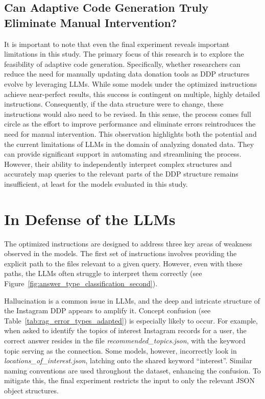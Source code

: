 \documentclass{DESSThesis}
\begin{document}
\subsection{Can Adaptive Code Generation Truly Eliminate Manual Intervention?}

It is important to note that even the final experiment reveals important limitations in this study. The primary focus of this research is to explore the feasibility of adaptive code generation. Specifically, whether researchers can reduce the need for manually updating data donation tools as DDP structures evolve by leveraging LLMs. While some models under the optimized instructions achieve near-perfect results, this success is contingent on multiple, highly detailed instructions. Consequently, if the data structure were to change, these instructions would also need to be revised. In this sense, the process comes full circle as the effort to improve performance and eliminate errors reintroduces the need for manual intervention. This observation highlights both the potential and the current limitations of LLMs in the domain of analyzing donated data. They can provide significant support in automating and streamlining the process. However, their ability to independently interpret complex structures and accurately map queries to the relevant parts of the DDP structure remains insufficient, at least for the models evaluated in this study.

\section{In Defense of the LLMs}

The optimized instructions are designed to address three key areas of weakness observed in the models. The first set of instructions involves providing the explicit path to the files relevant to a given query. However, even with these paths, the LLMs often struggle to interpret them correctly (see Figure~\ref{fig:answer_type_classification_second}). 

Hallucination is a common issue in LLMs, and the deep and intricate structure of the Instagram DDP appears to amplify it. Concept confusion (see Table~\ref{tab:rag_error_types_adapted}) is especially likely to occur. For example, when asked to identify the topics of interest Instagram records for a user, the correct answer resides in the file \emph{recommended\_topics.json}, with the keyword topic serving as the connection. Some models, however, incorrectly look in \emph{locations\_of\_interest.json}, latching onto the shared keyword “interest”. Similar naming conventions are used throughout the dataset, enhancing the confusion. To mitigate this, the final experiment restricts the input to only the relevant JSON object structures.
\end{document}
